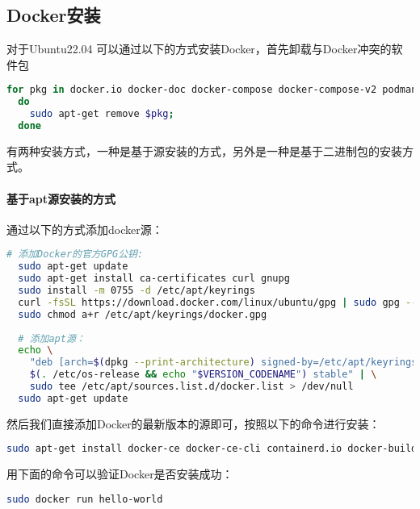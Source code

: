 \documentclass[lang=cn,a4paper,newtx]{elegantpaper}
\begin{document}
\subsection{Docker安装}
对于Ubuntu22.04 可以通过以下的方式安装Docker，首先卸载与Docker冲突的软件包
\begin{lstlisting}[language=bash]
  for pkg in docker.io docker-doc docker-compose docker-compose-v2 podman-docker containerd runc;
  do 
    sudo apt-get remove $pkg;
  done
\end{lstlisting}

有两种安装方式，一种是基于源安装的方式，另外是一种是基于二进制包的安装方式。
\paragraph{基于apt源安装的方式}
通过以下的方式添加docker源：
\begin{lstlisting}[language=bash]
  # 添加Docker的官方GPG公钥:
  sudo apt-get update
  sudo apt-get install ca-certificates curl gnupg
  sudo install -m 0755 -d /etc/apt/keyrings
  curl -fsSL https://download.docker.com/linux/ubuntu/gpg | sudo gpg --dearmor -o /etc/apt/keyrings/docker.gpg
  sudo chmod a+r /etc/apt/keyrings/docker.gpg
  
  # 添加apt源：
  echo \
    "deb [arch=$(dpkg --print-architecture) signed-by=/etc/apt/keyrings/docker.gpg] https://download.docker.com/linux/ubuntu \
    $(. /etc/os-release && echo "$VERSION_CODENAME") stable" | \
    sudo tee /etc/apt/sources.list.d/docker.list > /dev/null
  sudo apt-get update
\end{lstlisting}

然后我们直接添加Docker的最新版本的源即可，按照以下的命令进行安装：
\begin{lstlisting}[language=bash]
  sudo apt-get install docker-ce docker-ce-cli containerd.io docker-buildx-plugin docker-compose-plugin
\end{lstlisting}

用下面的命令可以验证Docker是否安装成功：
\begin{lstlisting}[language=bash]
  sudo docker run hello-world
\end{lstlisting}
\end{document}
